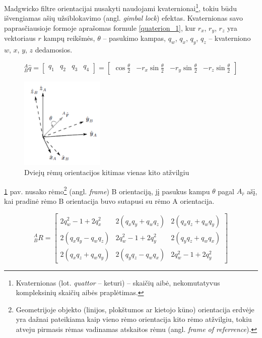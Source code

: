 \documentclass[]{vgtuef}
\begin{document}
Madgwicko filtre orientacijai nusakyti naudojami kvaternionai\footnote{  Kvaternionas (lot. \textit{quattor} – keturi) – skaičių aibė, nekomutatyvus kompleksinių skaičių aibės praplėtimas. }, tokiu būdu išvengiamas ašių užsiblokavimo (angl. \textit{gimbal lock}) efektas. Kvaternionas savo paprasčiausioje formoje aprašomas formule \ref{quaterion_1}, kur $r_{x}$, $r_{y}$, $r_{z}$ yra vektoriaus $r$ kampų reikšmės, $\theta$ – pasukimo kampas, $q_{w}$, $q_{x}$, $q_{y}$, $q_{z}$ – kvaterniono $w$, $x$, $y$, $z$ dedamosios. 

\begin{equation}
_{B}^{A}\hat{q}= \begin{bmatrix} q_{1} & q_{2} & q_{3} & q_{4}
\end{bmatrix} = \begin{bmatrix}
\cos\frac{\theta}{2} & -r_{x}\sin\frac{\theta}{2} & -r_{y}\sin\frac{\theta}{2} & -r_{z}\sin\frac{\theta}{2}
\end{bmatrix}
\label{quaterion_1}
\end{equation}

\begin{figure}[!h]
  \centering
  \includegraphics[width=150px]{img/quaternion_frame.png}
  \caption{Dviejų rėmų orientacijos kitimas vienas kito atžvilgiu}
  \label{fig:quaternion_2}
\end{figure}

\ref{fig:quaternion_2} pav. nusako rėmo\footnote{  Geometrijoje objekto (linijos, plokštumos ar kietojo kūno) orientacija erdvėje yra dažnai pateikiama kaip vieno rėmo orientacija kito rėmo atžvilgiu, tokiu atveju pirmasis rėmas vadinamas atskaitos rėmu (angl. \textit{frame of referrence}).} (angl. \textit{frame}) B orientaciją, jį pasukus kampu $\theta$ pagal $A_{\hat{r}}$  ašį, kai pradinė rėmo B orientacija buvo sutapusi su rėmo A orientacija.

\begin{equation}
_{B}^{A}R = \begin{bmatrix} 
   2q_{w}^{2} - 1 + 2q_{x}^{2} & 2(q_{x}q_{y}+q_{w}q_{z}) & 2(q_{x}q_{z}+q_{w}q_{y})
\\ 2(q_{x}q_{y}-q_{w}q_{z}) & 2q_{w}^{2} - 1 + 2q_{y}^{2} & 2(q_{y}q_{z}+q_{w}q_{x})
\\ 2(q_{x}q_{z}+q_{w}q_{y}) & 2(q_{y}q_{z}-q_{w}q_{x}) & 2q_{w}^{2} - 1 + 2q_{y}^{2}
\end{bmatrix}
\label{equ:rotation_matrix}
\end{equation}
\end{document}

